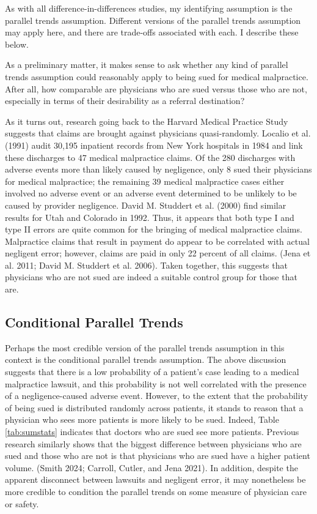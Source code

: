 \documentclass[
  12pt,
]{article}
\begin{document}
As with all difference-in-differences studies, my identifying assumption is the parallel trends assumption. Different versions of the parallel trends assumption may apply here, and there are trade-offs associated with each. I describe these below.

As a preliminary matter, it makes sense to ask whether any kind of parallel trends assumption could reasonably apply to being sued for medical malpractice. After all, how comparable are physicians who are sued versus those who are not, especially in terms of their desirability as a referral destination?

As it turns out, research going back to the Harvard Medical Practice Study suggests that claims are brought against physicians quasi-randomly. Localio et al. (1991) audit 30,195 inpatient records from New York hospitals in 1984 and link these discharges to 47 medical malpractice claims. Of the 280 discharges with adverse events more than likely caused by negligence, only 8 sued their physicians for medical malpractice; the remaining 39 medical malpractice cases either involved no adverse event or an adverse event determined to be unlikely to be caused by provider negligence. David M. Studdert et al. (2000) find similar results for Utah and Colorado in 1992. Thus, it appears that both type I and type II errors are quite common for the bringing of medical malpractice claims. Malpractice claims that result in payment do appear to be correlated with actual negligent error; however, claims are paid in only 22 percent of all claims. (Jena et al. 2011; David M. Studdert et al. 2006). Taken together, this suggests that physicians who are not sued are indeed a suitable control group for those that are.

\hypertarget{conditional-parallel-trends}{%
\subsection{Conditional Parallel Trends}\label{conditional-parallel-trends}}

Perhaps the most credible version of the parallel trends assumption in this context is the conditional parallel trends assumption. The above discussion suggests that there is a low probability of a patient's case leading to a medical malpractice lawsuit, and this probability is not well correlated with the presence of a negligence-caused adverse event. However, to the extent that the probability of being sued is distributed randomly across patients, it stands to reason that a physician who sees more patients is more likely to be sued. Indeed, Table \ref{tab:sumstats} indicates that doctors who are sued see more patients. Previous research similarly shows that the biggest difference between physicians who are sued and those who are not is that physicians who are sued have a higher patient volume. (Smith 2024; Carroll, Cutler, and Jena 2021). In addition, despite the apparent disconnect between lawsuits and negligent error, it may nonetheless be more credible to condition the parallel trends on some measure of physician care or safety.
\end{document}
